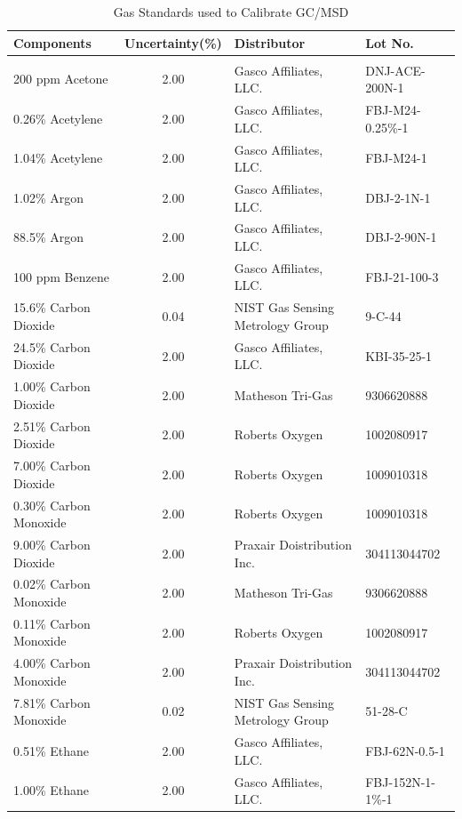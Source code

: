 \documentclass[12pt]{article}
\begin{document}
\begin{table}[h!]

\caption{Gas Standards used to Calibrate GC/MSD}
\label{tab:Gas_Standards_Table}
\centering
	\footnotesize
	\begin{tabular}{lcll}
			\hline
\textbf{Components} &\textbf{Uncertainty(\%)}& \textbf{Distributor}	& \textbf{Lot No.}		\\
\hline
\\[0.001cm]
200 ppm Acetone		&	2.00	&	Gasco Affiliates, LLC. 				&	DNJ-ACE-200N-1		\\
0.26\% Acetylene		&	2.00	&	Gasco Affiliates, LLC.				&	FBJ-M24-0.25\%-1		\\
1.04\% Acetylene		&	2.00	&	Gasco Affiliates, LLC.				&	FBJ-M24-1			\\
1.02\% Argon		&	2.00	&	Gasco Affiliates, LLC.				&	DBJ-2-1N-1			\\
88.5\% Argon		&	2.00	&	Gasco Affiliates, LLC.				&	DBJ-2-90N-1			\\
100 ppm Benzene		&	2.00	&	Gasco Affiliates, LLC.				&	FBJ-21-100-3		\\
15.6\% Carbon Dioxide	&	0.04	&	NIST Gas Sensing Metrology Group		&	9-C-44			\\
24.5\% Carbon Dioxide	&	2.00	&	Gasco Affiliates, LLC. 				&	KBI-35-25-1			\\
1.00\% Carbon Dioxide	&	2.00	&	Matheson Tri-Gas					&	9306620888			\\
2.51\% Carbon Dioxide	&	2.00	&	Roberts Oxygen					&	1002080917			\\
7.00\% Carbon Dioxide	&	2.00	&	Roberts Oxygen					&	1009010318			\\
0.30\% Carbon Monoxide	&	2.00	&	Roberts Oxygen					&	1009010318			\\
9.00\% Carbon Dioxide	&	2.00	&	Praxair Doistribution Inc. 				&	304113044702		\\
0.02\% Carbon Monoxide	&	2.00	&	Matheson Tri-Gas					&	9306620888			\\
0.11\% Carbon Monoxide	&	2.00	&	Roberts Oxygen					&	1002080917			\\
4.00\% Carbon Monoxide	&	2.00	&	Praxair Doistribution Inc. 				&	304113044702		\\
7.81\% Carbon Monoxide	&	0.02	&	NIST Gas Sensing Metrology Group 		&	51-28-C			\\
0.51\% Ethane		&	2.00	&	Gasco Affiliates, LLC.				&	FBJ-62N-0.5-1		\\
1.00\% Ethane		&	2.00	&	Gasco Affiliates, LLC.				&	FBJ-152N-1-1\%-1		\\

\end{tabular}
\end{table}
\end{document}
